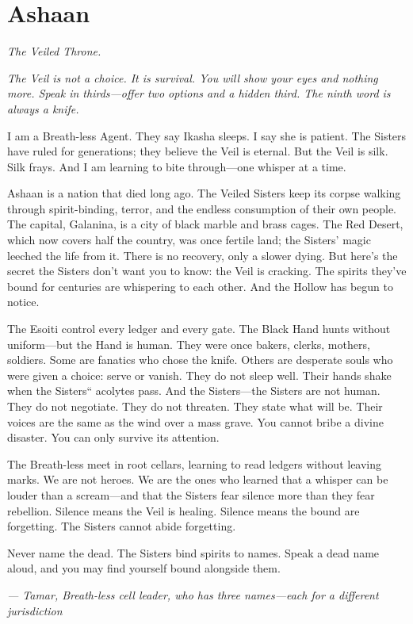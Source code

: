 \documentclass[12pt,oneside]{book}
\begin{document}
\newpage

\newpage

\chapter{Ashaan}
\emph{The Veiled Throne.}

\noindent
{\Large
\textit{The Veil is not a choice. It is survival. You will show your eyes and nothing more. Speak in thirds---offer two options and a hidden third. The ninth word is always a knife.}

\vspace{0.5em}

I am a Breath-less Agent. They say Ikasha sleeps. I say she is patient. The Sisters have ruled for generations; they believe the Veil is eternal. But the Veil is silk. Silk frays. And I am learning to bite through---one whisper at a time.

\vspace{0.5em}

Ashaan is a nation that died long ago. The Veiled Sisters keep its corpse walking through spirit-binding, terror, and the endless consumption of their own people. The capital, Galanina, is a city of black marble and brass cages. The Red Desert, which now covers half the country, was once fertile land; the Sisters' magic leeched the life from it. There is no recovery, only a slower dying. But here's the secret the Sisters don't want you to know: the Veil is cracking. The spirits they've bound for centuries are whispering to each other. And the Hollow has begun to notice.

\vspace{0.5em}

The Esoiti control every ledger and every gate. The Black Hand hunts without uniform---but the Hand is human. They were once bakers, clerks, mothers, soldiers. Some are fanatics who chose the knife. Others are desperate souls who were given a choice: serve or vanish. They do not sleep well. Their hands shake when the Sisters`` acolytes pass. And the Sisters---the Sisters are not human. They do not negotiate. They do not threaten. They state what will be. Their voices are the same as the wind over a mass grave. You cannot bribe a divine disaster. You can only survive its attention.

The Breath-less meet in root cellars, learning to read ledgers without leaving marks. We are not heroes. We are the ones who learned that a whisper can be louder than a scream---and that the Sisters fear silence more than they fear rebellion. Silence means the Veil is healing. Silence means the bound are forgetting. The Sisters cannot abide forgetting.

\vspace{0.5em}

Never name the dead. The Sisters bind spirits to names. Speak a dead name aloud, and you may find yourself bound alongside them.

\vspace{1em}

\noindent\textit{--- Tamar, Breath-less cell leader, who has three names---each for a different jurisdiction}
}
\end{document}
